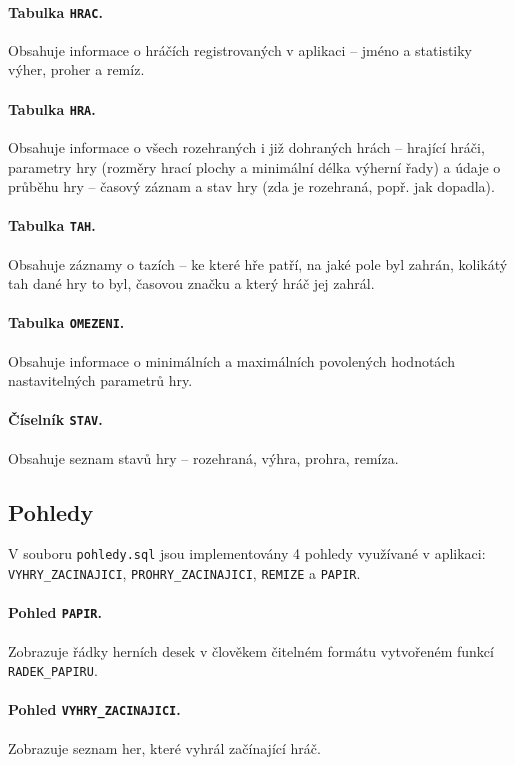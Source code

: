 \documentclass[11pt,a4paper,parskip=half-]{scrartcl}
\newcommand{\code}[1]{\texttt{#1}}
\begin{document}
\paragraph{Tabulka \code{HRAC}.} Obsahuje informace o hráčích registrovaných v
aplikaci -- jméno a statistiky výher, proher a remíz.

\paragraph{Tabulka \code{HRA}.} Obsahuje informace o všech rozehraných i již
dohraných hrách -- hrající hráči, parametry hry (rozměry hrací plochy a
minimální délka výherní řady) a údaje o průběhu hry -- časový záznam a stav hry
(zda je rozehraná, popř. jak dopadla).

\paragraph{Tabulka \code{TAH}.} Obsahuje záznamy o tazích -- ke které hře
patří, na jaké pole byl zahrán, kolikátý tah dané hry to byl, časovou značku a
který hráč jej zahrál.

\paragraph{Tabulka \code{OMEZENI}.} Obsahuje informace o minimálních a
maximálních povolených hodnotách nastavitelných parametrů hry.

\paragraph{Číselník \code{STAV}.} Obsahuje seznam stavů hry -- rozehraná, výhra,
prohra, remíza.

\subsection{Pohledy}

V souboru \code{pohledy.sql} jsou implementovány 4 pohledy využívané v aplikaci:
\code{VYHRY\_ZACINAJICI}, \code{PROHRY\_ZACINAJICI}, \code{REMIZE} a
\code{PAPIR}.

\paragraph{Pohled \code{PAPIR}.} Zobrazuje řádky herních desek v člověkem
čitelném formátu vytvořeném funkcí \code{RADEK\_PAPIRU}.

\paragraph{Pohled \code{VYHRY\_ZACINAJICI}.} Zobrazuje seznam her, které
vyhrál začínající hráč.
\end{document}
